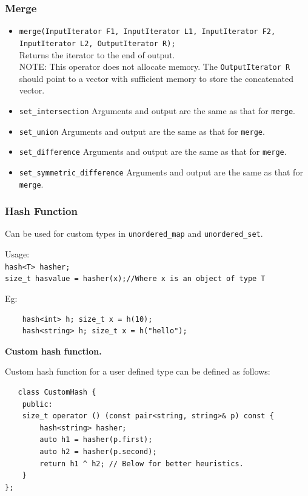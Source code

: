 \subsubsection{Merge}
\begin{itemize}
\item \texttt{merge(InputIterator F1, InputIterator L1, InputIterator F2, InputIterator L2, OutputIterator R);} \\
Returns the iterator to the end of output.\\
NOTE: This operator does not allocate memory. The \texttt{OutputIterator R} should point to a vector with sufficient memory to store the concatenated vector.\\
\item \texttt{set\_intersection} Arguments and output are the same as that for \texttt{merge}.
\item \texttt{set\_union} Arguments and output are the same as that for \texttt{merge}.
\item \texttt{set\_difference} Arguments and output are the same as that for \texttt{merge}.
\item \texttt{set\_symmetric\_difference} Arguments and output are the same as that for \texttt{merge}.
\end{itemize}

\subsubsection{Hash Function}
Can be used for custom types in \texttt{unordered\_map} and \texttt{unordered\_set}.
\begin{mdframed}[backgroundcolor=gray!10,linecolor=Firebrick4]
Usage:\\
\texttt{hash<T> hasher;}\\
\texttt{size\_t hasvalue = hasher(x);//Where x is an object of type T}\\
\end{mdframed}
Eg:
\begin{verbatim}
    hash<int> h; size_t x = h(10);
    hash<string> h; size_t x = h("hello");
\end{verbatim}

\textbf{Custom hash function.}

Custom hash function for a user defined type can be defined as follows:
\begin{verbatim}
   class CustomHash {
    public:
    size_t operator () (const pair<string, string>& p) const {
        hash<string> hasher;
        auto h1 = hasher(p.first);
        auto h2 = hasher(p.second);
        return h1 ^ h2; // Below for better heuristics.
    }
}; 
\end{verbatim}

